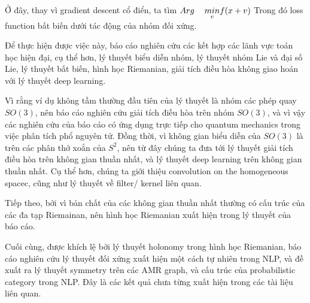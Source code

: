 Ở đây, thay vì gradient descent cổ điển, ta tìm $Arg \hspace{12px} \underset{v}{min} f(x+v) $ 
Trong đó loss function bất biến dưới tác động của nhóm đối xứng.


Để thực hiện được việc này, báo cáo nghiên cứu các kết hợp các lãnh vực toán học hiện đại, cụ thể hơn, lý thuyết biểu diễn nhóm, lý thuyết nhóm Lie và đại số Lie, lý thuyết bất biến, hình học Riemanian, giải tích điều hòa không giao hoán với lý thuyết deep learning. 

Vì rằng ví dụ không tầm thường đầu tiên của lý thuyết là nhóm các phép quay $SO(3)$, nên báo cáo nghiên cứu giải tích điều hòa trên nhóm $SO(3)$, và vì vậy  các nghiên cứu của báo cáo có ứng dụng trực tiếp cho quantum mechanics trong việc phân tích phổ nguyên tử. 
Đồng thời, vì không gian biểu diễn của $SO(3)$ là trên các phân thớ xoắn của $S^2$, nên từ đây chúng ta đưa tới lý thuyết giải tích điều hòa trên không gian thuần nhất, và lý thuyết deep learning trên không gian thuần nhất.
Cụ thể hơn, chúng ta giới thiệu convolution on the homogeneous spacec, cũng như lý thuyết về filter/ kernel liên quan.


Tiếp theo, bởi vì bản chất của các không gian thuần nhất thường có cấu trúc của các đa tạp Riemainan, nên hình học Riemanian xuất hiện trong lý thuyết của báo cáo.


Cuối cùng, được khích lệ bởi lý thuyết holonomy trong hình học Riemanian, báo cáo nghiên cứu lý thuyết đối xứng xuất hiện một cách tự nhiên trong NLP, và đề xuất ra lý thuyết  symmetry trên các AMR graph, và cấu trúc của probabilistic  category trong NLP. Đây là các kết quả chưa từng xuất hiện trong các tài liệu liên quan.  
